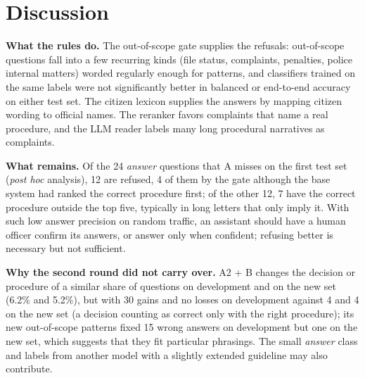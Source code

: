 \section{Discussion}

\textbf{What the rules do.} The out-of-scope gate supplies the refusals: out-of-scope questions fall into a few recurring kinds (file
status, complaints, penalties, police internal matters) worded regularly enough for patterns, and classifiers trained on the same labels
were not significantly better in balanced or end-to-end accuracy on either test set. The citizen lexicon supplies the answers by mapping citizen wording to official names.
The reranker favors complaints that name a real procedure, and the LLM reader labels many long procedural narratives as complaints.

\textbf{What remains.} Of the 24 \emph{answer} questions that A misses on the first test set (\emph{post hoc} analysis), 12 are refused, 4 of them
by the gate although the base system had ranked the correct procedure first; of the other 12, 7 have the correct procedure outside the
top five, typically in long letters that only imply it. With such low answer precision on random traffic, an assistant should have a human
officer confirm its answers, or answer only when confident\cite{geifman2017}; refusing better is necessary but not sufficient.

\textbf{Why the second round did not carry over.} A2 + B changes the decision or procedure of a similar share of questions on development
and on the new set (6.2\% and 5.2\%), but with 30 gains and no losses on development against 4 and 4 on the new set (a decision counting
as correct only with the right procedure); its new out-of-scope patterns fixed 15 wrong answers on development but one on the new set,
which suggests that they fit particular phrasings. The small \emph{answer} class and labels from another model with a slightly extended
guideline may also contribute.

